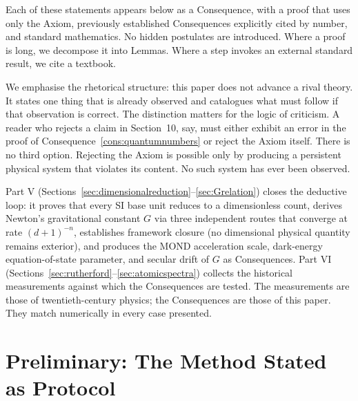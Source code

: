 \documentclass[11pt,twocolumn,a4paper]{article}
\theoremstyle{axiomstyle}
\theoremstyle{conseqstyle}
\theoremstyle{definition}
\theoremstyle{remark}
\begin{document}
Each of these statements appears below as a Consequence, with a proof that uses only the Axiom, previously established Consequences explicitly cited by number, and standard mathematics. No hidden postulates are introduced. Where a proof is long, we decompose it into Lemmas. Where a step invokes an external standard result, we cite a textbook.

We emphasise the rhetorical structure: this paper does not advance a rival theory. It states one thing that is already observed and catalogues what must follow if that observation is correct. The distinction matters for the logic of criticism. A reader who rejects a claim in Section~10, say, must either exhibit an error in the proof of Consequence~\ref{cons:quantumnumbers} or reject the Axiom itself. There is no third option. Rejecting the Axiom is possible only by producing a persistent physical system that violates its content. No such system has ever been observed.

Part V (Sections~\ref{sec:dimensionalreduction}--\ref{sec:Grelation}) closes the deductive loop: it proves that every SI base unit reduces to a dimensionless count, derives Newton's gravitational constant $G$ via three independent routes that converge at rate $(d+1)^{-n}$, establishes framework closure (no dimensional physical quantity remains exterior), and produces the MOND acceleration scale, dark-energy equation-of-state parameter, and secular drift of $G$ as Consequences. Part VI (Sections~\ref{sec:rutherford}--\ref{sec:atomicspectra}) collects the historical measurements against which the Consequences are tested. The measurements are those of twentieth-century physics; the Consequences are those of this paper. They match numerically in every case presented.

\section{Preliminary: The Method Stated as Protocol}
\label{sec:protocol}
\end{document}
